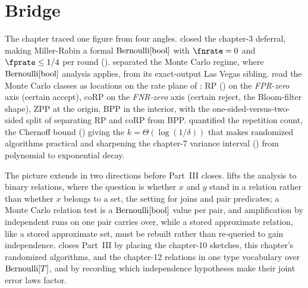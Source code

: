 %

\section{Bridge}
\label{sec:ch11-bridge}

The chapter traced one figure from four angles.
 closed the chapter-3 deferral, making
Miller-Rabin a formal $\mathrm{Bernoulli}[\mathrm{bool}]$ with $\fnrate = 0$ and
$\fprate \le 1/4$ per round ().
 separated the Monte Carlo regime, where
$\mathrm{Bernoulli}[\mathrm{bool}]$ analysis applies, from its exact-output Las Vegas
sibling.  read the Monte Carlo classes as locations on the
rate plane of : RP () on the
\emph{FPR-zero} axis (certain accept), coRP on the \emph{FNR-zero} axis (certain
reject, the Bloom-filter shape), ZPP at the origin, BPP in the interior, with
the one-sided-versus-two-sided split of 
separating RP and coRP from BPP.  quantified the
repetition count, the Chernoff bound () giving the
$k = \Theta(\log(1/\delta))$ that makes randomized algorithms practical and
sharpening the chapter-7 variance interval () from
polynomial to exponential decay.

The picture extends in two directions before Part~III closes.
 lifts the analysis to binary relations, where
the question is whether $x$ and $y$ stand in a relation rather than whether $x$
belongs to a set, the setting for joins and pair predicates; a Monte Carlo
relation test is a $\mathrm{Bernoulli}[\mathrm{bool}]$ value per pair, and amplification by
independent runs on one pair carries over, while a stored approximate relation,
like a stored approximate set, must be rebuilt rather than re-queried to gain
independence.  closes Part~III by placing the chapter-10
sketches, this chapter's randomized algorithms, and the chapter-12 relations in
one type vocabulary over $\mathrm{Bernoulli}[T]$, and by recording which independence
hypotheses make their joint error laws factor.
